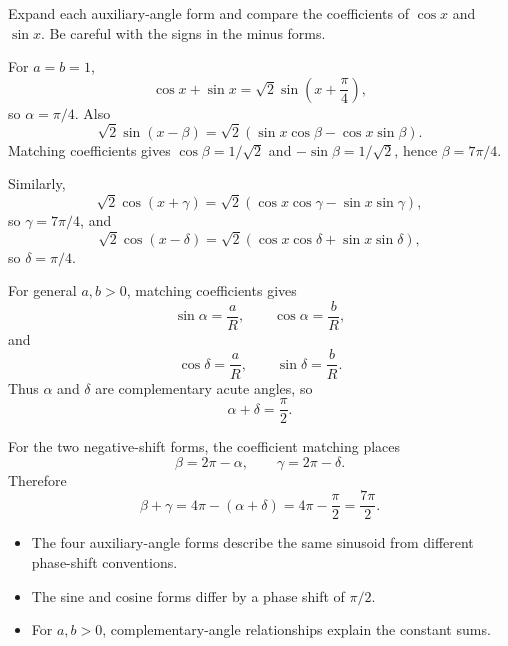 \begin{hintbox}
Expand each auxiliary-angle form and compare the coefficients of $\cos x$ and
$\sin x$. Be careful with the signs in the minus forms.
\end{hintbox}

\begin{solution}
For $a=b=1$,
\[
\cos x+\sin x=\sqrt2\sin\left(x+\frac{\pi}{4}\right),
\]
so $\alpha=\pi/4$. Also
\[
\sqrt2\sin(x-\beta)
=\sqrt2(\sin x\cos\beta-\cos x\sin\beta).
\]
Matching coefficients gives $\cos\beta=1/\sqrt2$ and
$-\sin\beta=1/\sqrt2$, hence $\beta=7\pi/4$.

Similarly,
\[
\sqrt2\cos(x+\gamma)
=\sqrt2(\cos x\cos\gamma-\sin x\sin\gamma),
\]
so $\gamma=7\pi/4$, and
\[
\sqrt2\cos(x-\delta)
=\sqrt2(\cos x\cos\delta+\sin x\sin\delta),
\]
so $\delta=\pi/4$.

For general $a,b>0$, matching coefficients gives
\[
\sin\alpha=\frac{a}{R},
\qquad
\cos\alpha=\frac{b}{R},
\]
and
\[
\cos\delta=\frac{a}{R},
\qquad
\sin\delta=\frac{b}{R}.
\]
Thus $\alpha$ and $\delta$ are complementary acute angles, so
\[
\alpha+\delta=\frac{\pi}{2}.
\]

For the two negative-shift forms, the coefficient matching places
\[
\beta=2\pi-\alpha,
\qquad
\gamma=2\pi-\delta.
\]
Therefore
\[
\beta+\gamma
=4\pi-(\alpha+\delta)
=4\pi-\frac{\pi}{2}
=\frac{7\pi}{2}.
\]
\end{solution}

\begin{takeaways}
\begin{itemize}[leftmargin=*]
  \item The four auxiliary-angle forms describe the same sinusoid from
        different phase-shift conventions.
  \item The sine and cosine forms differ by a phase shift of $\pi/2$.
  \item For $a,b>0$, complementary-angle relationships explain the constant
        sums.
\end{itemize}
\end{takeaways}

